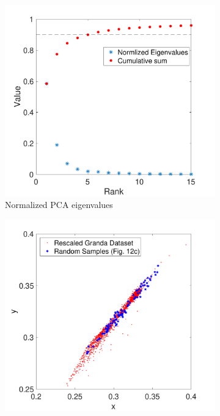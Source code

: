\documentclass{jov}
\begin{document}
\begin{figure}
	\begin{subfigure}[b]{0.3 \textwidth}
    \centering
        \includegraphics[width=\textwidth]{../Figures/Figure6/Figure6_e.pdf}
        \caption{Normalized PCA eigenvalues}
        \label{fig:granadaEV}
    \end{subfigure}
	\begin{subfigure}[b]{0.3 \textwidth}
    \centering
        \includegraphics[width=\textwidth]{../Figures/Figure6/Figure6_d.pdf}

\end{subfigure}
\end{figure}
\end{document}
